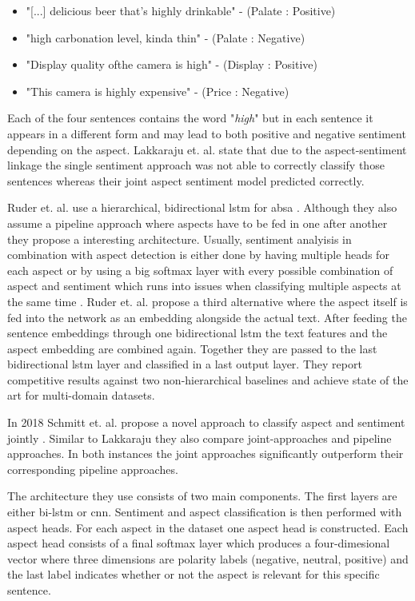 \begin{itemize}
	\item "{[...]} delicious beer that’s highly drinkable" - {(Palate : Positive)}
	\item "high carbonation level, kinda thin" - {(Palate : Negative)}
	\item "Display quality ofthe camera is high" - {(Display : Positive)}
	\item "This camera is highly expensive" - {(Price : Negative)}
\end{itemize}

Each of the four sentences contains the word "\textit{high}" but in each sentence it appears in a different form and may lead to both positive and negative sentiment depending on the aspect. Lakkaraju et. al. state that due to the aspect-sentiment linkage the single sentiment approach was not able to correctly classify those sentences whereas their joint aspect sentiment model predicted correctly.
\medskip

Ruder et. al. use a hierarchical, bidirectional \gls{lstm} for \gls{absa} \cite{Ruder2016}. Although they also assume a pipeline approach where aspects have to be fed in one after another they propose a interesting architecture. Usually, sentiment analyisis in combination with aspect detection is either done by having multiple heads for each aspect \cite{Schmitt2018} or by using a big softmax layer with every possible combination of aspect and sentiment which runs into issues when classifying multiple aspects at the same time \cite{Lakkaraju2014}. Ruder et. al. propose a third alternative where the aspect itself is fed into the network as an embedding alongside the actual text. After feeding the sentence embeddings through one bidirectional \gls{lstm} the text features and the aspect embedding are combined again. Together they are passed to the last bidirectional \gls{lstm} layer and classified in a last output layer. They report competitive results against two non-hierarchical baselines and achieve state of the art for multi-domain datasets.
\medskip

In 2018 Schmitt et. al. propose a novel approach to classify aspect and sentiment jointly \cite{Schmitt2018}. Similar to Lakkaraju they also compare joint-approaches and pipeline approaches. In both instances the joint approaches significantly outperform their corresponding pipeline approaches. 

The architecture they use consists of two main components. The first layers are either bi-\gls{lstm} or \gls{cnn}. Sentiment and aspect classification is then performed with aspect heads. For each aspect in the dataset one aspect head is constructed. Each aspect head consists of a final softmax layer which produces a four-dimesional vector where three dimensions are polarity labels {(negative, neutral, positive)} and the last label indicates whether or not the aspect is relevant for this specific sentence. 

